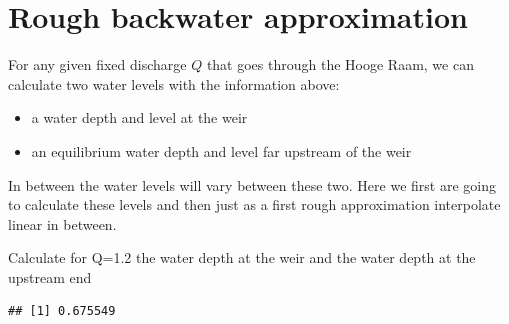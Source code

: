 \documentclass[
]{article}
\newenvironment{Shaded}{\begin{snugshade}}{\end{snugshade}}
\newcommand{\CommentTok}[1]{\textcolor[rgb]{0.56,0.35,0.01}{\textit{#1}}}
\newcommand{\ControlFlowTok}[1]{\textcolor[rgb]{0.13,0.29,0.53}{\textbf{#1}}}
\newcommand{\DecValTok}[1]{\textcolor[rgb]{0.00,0.00,0.81}{#1}}
\newcommand{\FloatTok}[1]{\textcolor[rgb]{0.00,0.00,0.81}{#1}}
\newcommand{\FunctionTok}[1]{\textcolor[rgb]{0.13,0.29,0.53}{\textbf{#1}}}
\newcommand{\NormalTok}[1]{#1}
\newcommand{\OtherTok}[1]{\textcolor[rgb]{0.56,0.35,0.01}{#1}}
\newcommand{\SpecialCharTok}[1]{\textcolor[rgb]{0.81,0.36,0.00}{\textbf{#1}}}
\begin{document}
\hypertarget{rough-backwater-approximation}{%
\section{Rough backwater
approximation}\label{rough-backwater-approximation}}

For any given fixed discharge \(Q\) that goes through the Hooge Raam, we
can calculate two water levels with the information above:

\begin{itemize}
\item
  a water depth and level at the weir
\item
  an equilibrium water depth and level far upstream of the weir
\end{itemize}

In between the water levels will vary between these two. Here we first
are going to calculate these levels and then just as a first rough
approximation interpolate linear in between.

Calculate for Q=1.2 the water depth at the weir and the water depth at
the upstream end

\begin{Shaded}
\end{Shaded}

\begin{verbatim}
## [1] 0.675549
\end{verbatim}

\begin{Shaded}
\end{Shaded}
\end{document}
